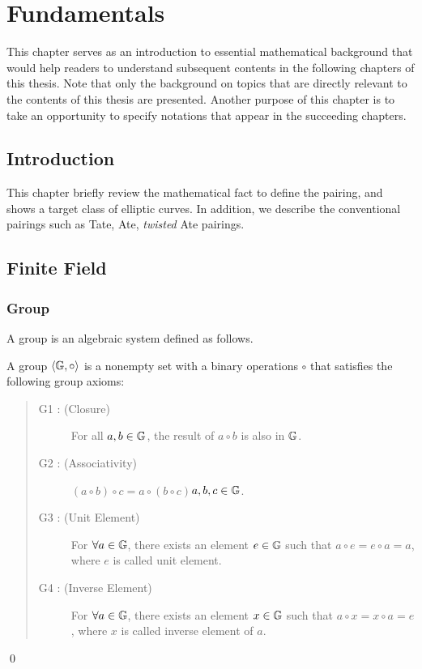 
\chapter{Fundamentals}
This chapter serves as an introduction to essential mathematical background that would help readers to understand subsequent contents in the following chapters of this thesis. Note that only the background on topics that are directly relevant to the contents of this thesis are presented. Another purpose of this chapter is to take an opportunity to specify notations that appear in the succeeding chapters.
\label{Chapter2} %

\section{Introduction}
This chapter briefly review the mathematical fact to define the pairing, and shows a target class of elliptic curves.
In addition, we describe the conventional pairings such as Tate, Ate, {\it twisted} Ate pairings.


\section{Finite Field}
\subsection{Group}\label{group}

A group  is an algebraic system defined as follows.
\begin{definition}
A group $\langle\mathbb{G}\index{group},\circ\rangle$ is a nonempty set with a binary operations $\circ$ that satisfies the following group axioms:
\begin{quote}\begin{description}
\item[G1 : (Closure)] For all $a, b \in\mathbb{G}\index{group}$, the result of $a\circ b$ is also in $\mathbb{G}\index{group}$.
\item[G2 : (Associativity)] $(a\circ b)\circ c=a\circ (b\circ c)$\hspace{2em}$a,b,c\in\mathbb{G}\index{group}$.
\item[G3 : (Unit Element)] For $\forall a \in\mathbb{G}\index{group}$, there exists an element $e\in\mathbb{G}\index{group}$ such that $a\circ e=e\circ a=a$, where $e$ is called unit element.
\item[G4 : (Inverse Element)] For ${\forall}a \in\mathbb{G}\index{group}$, there exists an element $x\in\mathbb{G}\index{group}$ such that $a\circ x=x\circ a=e$, where $x$ is called inverse element of $a$.
\end{description}\end{quote}
\qed
\end{definition}

